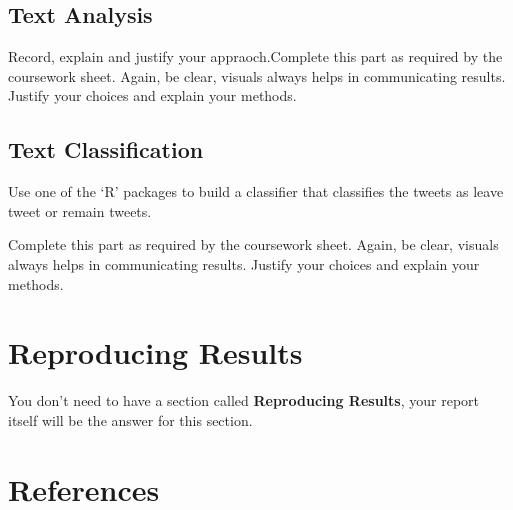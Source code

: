 \documentclass[10pt]{article}
\begin{document}
\subsection{Text Analysis}

Record, explain and justify your appraoch.Complete this part as required by the coursework sheet. Again, be clear, visuals always helps in communicating results. Justify your choices and explain your methods. 



\subsection{Text Classification}

Use one of the ‘R’ packages to build a classifier that classifies the tweets as leave tweet or remain tweets. 

Complete this part as required by the coursework sheet. Again, be clear, visuals always helps in communicating results. Justify your choices and explain your methods. 


\section{Reproducing Results}

You don't need to have a section called \textbf{Reproducing Results}, your report itself will be the answer for this section. 



\clearpage

\section{References}\label{pubs}

\printbibliography[heading =none]


\clearpage
\end{document}

